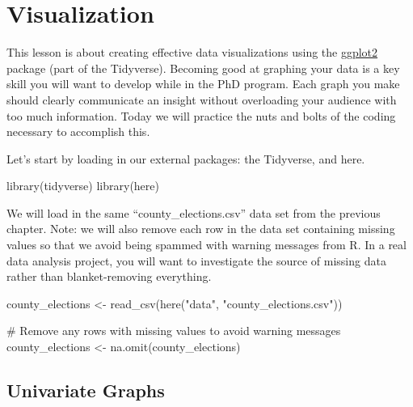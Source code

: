 \documentclass[
  letterpaper,
]{book}
\newenvironment{Shaded}{\begin{snugshade}}{\end{snugshade}}
\newcommand{\CommentTok}[1]{\textcolor[rgb]{0.37,0.37,0.37}{#1}}
\newcommand{\FunctionTok}[1]{\textcolor[rgb]{0.28,0.35,0.67}{#1}}
\newcommand{\NormalTok}[1]{\textcolor[rgb]{0.00,0.23,0.31}{#1}}
\newcommand{\OtherTok}[1]{\textcolor[rgb]{0.00,0.23,0.31}{#1}}
\newcommand{\StringTok}[1]{\textcolor[rgb]{0.13,0.47,0.30}{#1}}
\theoremstyle{definition}
\theoremstyle{definition}
\theoremstyle{plain}
\theoremstyle{definition}
\theoremstyle{plain}
\theoremstyle{plain}
\theoremstyle{remark}
\begin{document}
\hypertarget{dataviz}{%
\chapter{Visualization}\label{dataviz}}

This lesson is about creating effective data visualizations using the
\href{https://ggplot2.tidyverse.org/}{ggplot2} package (part of the
Tidyverse). Becoming good at graphing your data is a key skill you will
want to develop while in the PhD program. Each graph you make should
clearly communicate an insight without overloading your audience with
too much information. Today we will practice the nuts and bolts of the
coding necessary to accomplish this.

Let's start by loading in our external packages: the Tidyverse, and
here.

\begin{Shaded}
\begin{Highlighting}[]
\FunctionTok{library}\NormalTok{(tidyverse)}
\FunctionTok{library}\NormalTok{(here)}
\end{Highlighting}
\end{Shaded}

We will load in the same ``county\_elections.csv'' data set from the
previous chapter. Note: we will also remove each row in the data set
containing missing values so that we avoid being spammed with warning
messages from R. In a real data analysis project, you will want to
investigate the source of missing data rather than blanket-removing
everything.

\begin{Shaded}
\begin{Highlighting}[]
\NormalTok{county\_elections }\OtherTok{\textless{}{-}} \FunctionTok{read\_csv}\NormalTok{(}\FunctionTok{here}\NormalTok{(}\StringTok{"data"}\NormalTok{, }\StringTok{"county\_elections.csv"}\NormalTok{))}

\CommentTok{\# Remove any rows with missing values to avoid warning messages}
\NormalTok{county\_elections }\OtherTok{\textless{}{-}} \FunctionTok{na.omit}\NormalTok{(county\_elections)}
\end{Highlighting}
\end{Shaded}

\hypertarget{univariate-graphs}{%
\section{Univariate Graphs}\label{univariate-graphs}}
\end{document}
